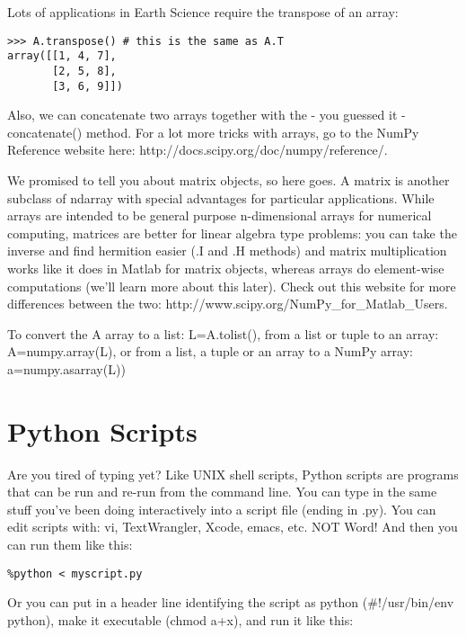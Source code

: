 {Lots of applications in Earth Science require the transpose of an array:
{\singlespacing \color{blue} \begin{verbatim}
>>> A.transpose() # this is the same as A.T  
array([[1, 4, 7],
       [2, 5, 8],
       [3, 6, 9]])
\end{verbatim}}

Also, we can concatenate two arrays together with the - you guessed it - {\color{blue}concatenate()} method.   For a lot more tricks with arrays, go to the NumPy Reference website here:  http://docs.scipy.org/doc/numpy/reference/.   

 We promised to tell you about matrix objects, so here goes. 
A matrix is another subclass of ndarray with special advantages for particular applications.   
While arrays are intended to be general purpose n-dimensional arrays for numerical computing, 
matrices are better for linear algebra type problems: you can take the inverse and find hermition easier (.I and .H methods) and matrix multiplication works like it does in Matlab for matrix objects, whereas arrays do element-wise computations (we'll learn more about this later).  
Check out this website for more differences between the two: http://www.scipy.org/NumPy\_for\_Matlab\_Users. 



To convert the {\color{blue}A} array to a list:   {\color{blue}L=A.tolist()},  from a list or tuple to an array:   {\color{blue}A=numpy.array(L)}, or from a list, a tuple or an array to a NumPy array:   {\color{blue}a=numpy.asarray(L))}




\section{Python Scripts}

Are you tired of typing yet?  Like UNIX shell scripts, 
Python scripts are programs that can be run and re-run from the command line.
You can type in the same stuff you've been doing interactively into a script file (ending in .py). You can edit scripts with: vi, TextWrangler, Xcode, emacs, etc.  NOT Word!  And then you can run them like this:

{\singlespacing \color{blue} \begin{verbatim}
%python < myscript.py
\end{verbatim}}
 Or you can put in a header line identifying the script as python (\#!/usr/bin/env python), make  it executable (chmod a+x),  and   run it like this:

}
